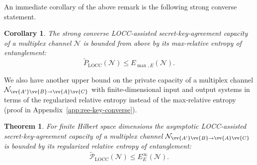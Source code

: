 \documentclass[aps,pra,twocolumn,superscriptaddress,longbibliography]{revtex4-1}
\def\LOCC{\operatorname{LOCC}}
\newcommand{\mc}[1]{\mathcal{#1}}
\newcommand{\wt}[1]{\widetilde{#1}}
\newtheorem{theorem}{Theorem}
\newtheorem{corollary}{Corollary}
\begin{document}
An immediate corollary of the above remark is the following strong converse statement. 
\begin{corollary}
The strong converse LOCC-assisted secret-key-agreement capacity of a multiplex channel $\mc{N}$ is bounded from above by its max-relative entropy of entanglement:
\begin{equation}
\wt{P}_{\LOCC}(\mc{N})\leq E_{\max,E}(\mc{N}).
\end{equation}
\end{corollary}




We also have another upper bound on the private capacity of a multiplex channel $\mc{N}_{\vv{A'}\vv{B}\to\vv{A}\vv{C}}$ with finite-dimensional input and output systems in terms of the regularized relative entropy instead of the max-relative entropy (proof in Appendix~\ref{app:ree-key-converse}). 
\begin{theorem}\label{thm:ree-key-converse}  
For finite Hilbert space dimensions the asymptotic LOCC-assisted secret-key-agreement capacity of a  multiplex channel $\mc{N}_{\vv{A'}\vv{B}\to\vv{A}\vv{C}}$ is bounded by its regularized relative entropy of entanglement:
\begin{equation}\label{eq:ree-key-converse} 
\widetilde{\mc{P}}_{\LOCC}(\mc{N})\leq E_{E}^\infty(\mc{N}).
\end{equation} 
\end{theorem}
\iffalse
\end{document}
